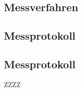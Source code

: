     
 
    

    \subsection{Messverfahren}
    \lipsum
    \vfill
    \subsection{Messprotokoll}
    

    \subsection{Messprotokoll}

\begin{table}[htbp]
  \centering
  \caption{}
  \begin{tabularx}{\textwidth}{ZZZZ}
    \toprule
            \midrule %
    \bottomrule
  \end{tabularx}
\label{table:}  
\end{table}

